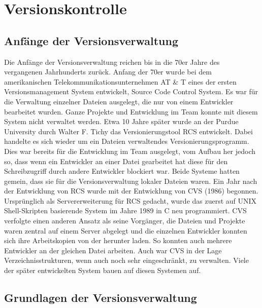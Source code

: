 \section{Versionskontrolle}
\subsection{Anfänge der Versionsverwaltung}
Die Anfänge der Versionsverwaltung reichen bis in die 70er Jahre des vergangenen Jahrhunderts zurück. Anfang der 70er wurde bei dem amerikanischen Telekommunikationsunternehmen AT \& T eines der ersten Versionsmanagement System entwickelt, Source Code Control System. Es war für die Verwaltung einzelner Dateien ausgelegt, die nur von einem Entwickler bearbeitet wurden. Ganze Projekte und Entwicklung im Team konnte mit diesem System nicht verwaltet werden. 
Etwa 10 Jahre später wurde an der Purdue University durch Walter F. Tichy das Versionierungstool RCS entwickelt. Dabei handelte es sich wieder um ein Dateien verwaltendes Versionierungsprogramm. Dies war bereits für die Entwicklung im Team ausgelegt, vom Aufbau her jedoch so, dass wenn ein Entwickler an einer Datei gearbeitet hat diese für den Schreibzugriff durch andere Entwickler blockiert war. Beide Systeme hatten gemein, dass sie für die Versionsverwaltung lokaler Dateien waren.
Ein Jahr nach der Entwicklung von RCS wurde mit der Entwicklung von CVS (1986) begonnen. Ursprünglich als Servererweiterung für RCS gedacht, wurde das zuerst auf UNIX Shell-Skripten basierende System im Jahre 1989 in C neu programmiert. CVS verfolgte einen anderen Ansatz als seine Vorgänger, die Dateien und Projekte waren zentral auf einem Server abgelegt und die einzelnen Entwickler konnten sich ihre Arbeitskopien von der herunter laden. So konnten auch mehrere Entwickler an der gleichen Datei arbeiten. Auch war CVS in der Lage Verzeichnisstrukturen, wenn auch noch sehr eingeschränkt, zu verwalten. 
Viele der später entwickelten System bauen auf diesen Systemen auf.





\subsection{Grundlagen der Versionsverwaltung}

